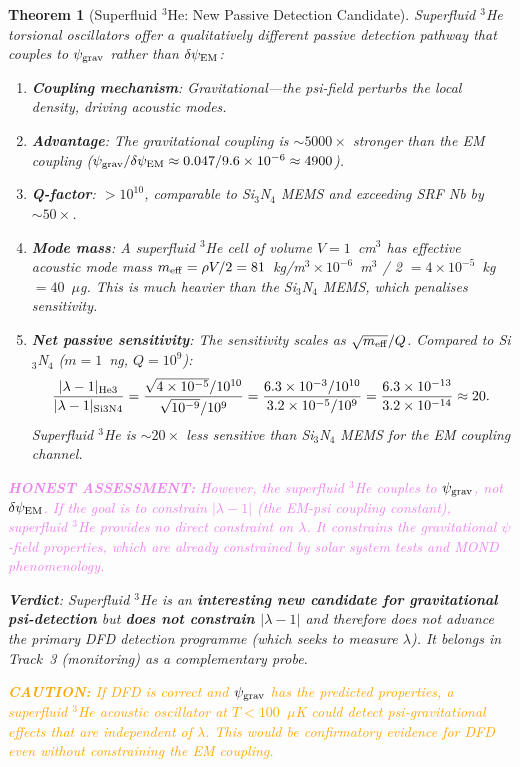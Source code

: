 \documentclass[11pt]{article}
\newtheorem{theorem}{Theorem}[section]
\theoremstyle{definition}
\theoremstyle{remark}
\newcommand{\ee}[1]{\times 10^{#1}}
\newcommand{\psigrav}{\psi_{\rm grav}}
\newcommand{\psiEM}{\delta\psi_{\rm EM}}
\newcommand{\lam}{|\lambda-1|}
\newcommand{\caution}[1]{\textcolor{orange}{\textbf{CAUTION:} #1}}
\newcommand{\honest}[1]{\textcolor{violet}{\textbf{HONEST ASSESSMENT:} #1}}
\begin{document}
\begin{theorem}[Superfluid $^3$He: New Passive Detection Candidate]
\label{thm:he3}
Superfluid $^3$He torsional oscillators offer a qualitatively different
passive detection pathway that couples to $\psigrav$ rather than
$\psiEM$:

\begin{enumerate}
  \item \textbf{Coupling mechanism}: Gravitational---the psi-field
    perturbs the local density, driving acoustic modes.
  \item \textbf{Advantage}: The gravitational coupling is $\sim 5000\times$
    stronger than the EM coupling ($\psigrav/\psiEM \approx 0.047/9.6\ee{-6}
    \approx 4900$).
  \item \textbf{Q-factor}: $>10^{10}$, comparable to Si$_3$N$_4$ MEMS
    and exceeding SRF Nb by $\sim 50\times$.
  \item \textbf{Mode mass}: A superfluid $^3$He cell of volume
    $V = 1$~cm$^3$ has effective acoustic mode mass
    $m_{\rm eff} = \rho V/2 = 81$~kg/m$^3 \times 10^{-6}$~m$^3$ / 2
    $= 4\ee{-5}$~kg $= 40$~$\mu$g.
    This is much heavier than the Si$_3$N$_4$ MEMS, which penalises
    sensitivity.
  \item \textbf{Net passive sensitivity}: The sensitivity scales as
    $\sqrt{m_{\rm eff}}/Q$. Compared to Si$_3$N$_4$ ($m = 1$~ng,
    $Q = 10^9$):
    \begin{equation}
      \frac{\lam_{\rm He3}}{\lam_{\rm Si3N4}}
      = \frac{\sqrt{4\ee{-5}}/10^{10}}{\sqrt{10^{-9}}/10^{9}}
      = \frac{6.3\ee{-3}/10^{10}}{3.2\ee{-5}/10^{9}}
      = \frac{6.3\ee{-13}}{3.2\ee{-14}} \approx 20.
    \end{equation}
    Superfluid $^3$He is $\sim 20\times$ less sensitive than Si$_3$N$_4$
    MEMS for the EM coupling channel.
\end{enumerate}

\honest{However, the superfluid $^3$He couples to $\psigrav$, not
$\psiEM$. If the goal is to constrain $|\lambda-1|$ (the EM-psi coupling
constant), superfluid $^3$He provides no direct constraint on $\lambda$.
It constrains the gravitational $\psi$-field properties, which are
already constrained by solar system tests and MOND phenomenology.}

\textbf{Verdict}: Superfluid $^3$He is an \textbf{interesting new
candidate for gravitational psi-detection} but \textbf{does not
constrain $|\lambda-1|$} and therefore does not advance the primary DFD
detection programme (which seeks to measure $\lambda$). It belongs in
Track~3 (monitoring) as a complementary probe.

\caution{If DFD is correct and $\psigrav$ has the predicted properties,
a superfluid $^3$He acoustic oscillator at $T < 100$~$\mu$K could
detect psi-gravitational effects that are independent of $\lambda$.
This would be confirmatory evidence for DFD even without constraining
the EM coupling.}
\end{theorem}
\end{document}
